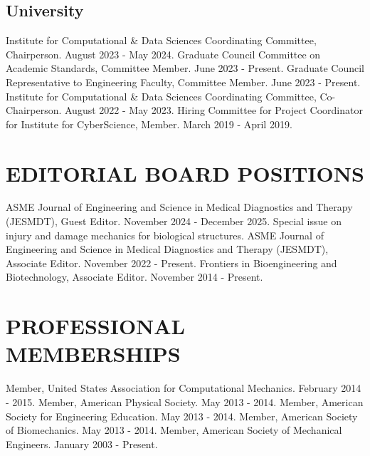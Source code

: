 \documentclass[a4paper,10pt]{article}
\begin{document}
\subsection*{University}

\noindent Institute for Computational \& Data Sciences Coordinating Committee, Chairperson. August 2023 - May 2024.\newline
\noindent Graduate Council Committee on Academic Standards, Committee Member. June 2023 - Present.\newline
\noindent Graduate Council Representative to Engineering Faculty, Committee Member. June 2023 - Present.\newline
\noindent Institute for Computational \& Data Sciences Coordinating Committee, Co-Chairperson. August 2022 - May 2023.\newline
\noindent Hiring Committee for Project Coordinator for Institute for CyberScience, Member. March 2019 - April 2019.\newline




\section*{EDITORIAL BOARD POSITIONS}

\noindent ASME Journal of Engineering and Science in Medical Diagnostics and Therapy (JESMDT), Guest Editor. November 2024 - December 2025. Special issue on injury and damage mechanics for biological structures.\newline
\noindent ASME Journal of Engineering and Science in Medical Diagnostics and Therapy (JESMDT), Associate Editor. November 2022 - Present.\newline
\noindent Frontiers in Bioengineering and Biotechnology, Associate Editor. November 2014 - Present.\newline




\section*{PROFESSIONAL MEMBERSHIPS}

\noindent Member, United States Association for Computational Mechanics. February 2014 - 2015.\newline
\noindent Member, American Physical Society. May 2013 - 2014.\newline
\noindent Member, American Society for Engineering Education. May 2013 - 2014.\newline
\noindent Member, American Society of Biomechanics. May 2013 - 2014.\newline
\noindent Member, American Society of Mechanical Engineers. January 2003 - Present.\newline
\end{document}
